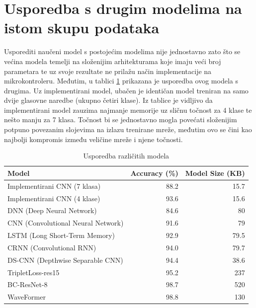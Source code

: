 \section{Usporedba s drugim modelima na istom skupu podataka}

Usporediti naučeni model s postojećim modelima nije jednostavno zato što
se većina modela temelji na složenijim arhitekturama koje imaju veći broj parametara te
uz svoje rezultate ne prilažu način implementacije na mikrokontroleru. Međutim,
u tablici \ref{tab:models} prikazana je usporedba ovog modela s drugima. Uz implementirani model,
ubačen je identičan model treniran na samo dvije glasovne naredbe (ukupno četiri klase).
Iz tablice je vidljivo da implementirani model zauzima najmanje memorije uz sličnu točnost za 4 klase te
nešto manju za 7 klasa. Točnost bi se jednostavno mogla povećati složenijim potpuno povezanim
slojevima na izlazu trenirane mreže, međutim ovo se čini kao najbolji kompromis između veličine
mreže i njene točnosti.

\newpage

\begin{table}[htb]
    \centering
    \begin{tabular}{|l|r|r|}
        \hline
        \textbf{Model} & \textbf{Accuracy (\%)} & \textbf{Model Size (KB)} \\ \hline
        Implementirani CNN (7 klasa) & 88.2 & 15.7 \\ 
        Implementirani CNN (4 klase) & 93.6 & 15.6 \\ 
        DNN (Deep Neural Network)          \cite{zhang2017hello} & 84.6 & 80 \\
        CNN (Convolutional Neural Network) \cite{zhang2017hello} & 91.6 & 79 \\
        LSTM (Long Short-Term Memory)      \cite{zhang2017hello} & 92.9 & 79.5 \\
        CRNN (Convolutional RNN)           \cite{zhang2017hello} & 94.0 & 79.7 \\
        DS-CNN (Depthwise Separable CNN)   \cite{zhang2017hello} & 94.4 & 38.6  \\
        TripletLoss-res15 \cite{triplet} & 95.2 & 237 \\
        BC-ResNet-8 \cite{res} & 98.7 & 520 \\
        WaveFormer \cite{waveformer} & 98.8 & 130  \\
        \hline
    \end{tabular}
    \caption{Usporedba različitih modela}
    \label{tab:models}
\end{table}
